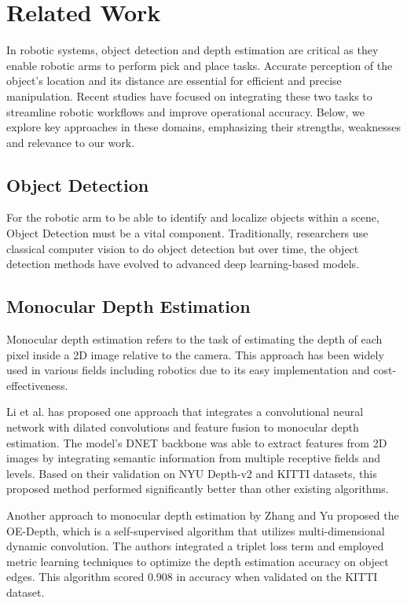 \section{Related Work}
In robotic systems, object detection and depth estimation are critical as they enable robotic arms to perform pick and place tasks. Accurate perception of the object’s location and its distance are essential for efficient and precise manipulation. Recent studies have focused on integrating these two tasks to streamline robotic workflows and improve operational accuracy. 
Below, we explore key approaches in these domains, emphasizing their strengths, weaknesses and relevance to our work.

\vspace{10pt}

\subsection{Object Detection}
For the robotic arm to be able to identify and localize objects within a scene, Object Detection must be a vital component. Traditionally, researchers use classical computer vision to do object detection but over time, the object detection methods have evolved to advanced deep learning-based models.

\subsection{Monocular Depth Estimation}
Monocular depth estimation refers to the task of estimating the depth of each pixel inside a 2D image relative to the camera. This approach has been widely used in various fields including robotics due to its easy implementation and cost-effectiveness.

\vspace{10pt}

Li et al. \cite{huiyi_li__2024} has proposed one approach that integrates a convolutional neural network with dilated convolutions and feature fusion to monocular depth estimation. The model’s DNET backbone was able to extract features from 2D images by integrating semantic information from multiple receptive fields and levels. Based on their validation on NYU Depth-v2 and KITTI datasets, this proposed method performed significantly better than other existing algorithms.

\vspace{10pt}

Another approach to monocular depth estimation by Zhang and Yu \cite{rui_zhang__2024} proposed the OE-Depth, which is a self-supervised algorithm that utilizes multi-dimensional dynamic convolution. The authors integrated a triplet loss term and employed metric learning techniques to optimize the depth estimation accuracy on object edges. This algorithm scored 0.908 in accuracy when validated on the KITTI dataset.

